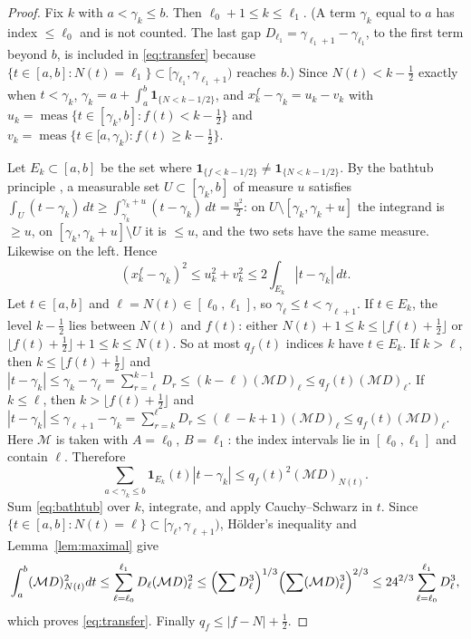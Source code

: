\documentclass[11pt,a4paper]{article}
\makeatletter
\numberwithin{equation}{section}
\DeclareRobustCommand{\CGref}[1]{\ref{#1}}
\DeclareRobustCommand{\CGeqref}[1]{\eqref{#1}}
\DeclareRobustCommand{\CGcite}[2][]{\if\relax\detokenize{#1}\relax\cite{#2}\else\cite[#1]{#2}\fi}
\let\CG@origref\ref
\let\CG@origeqref\eqref
\newcommand{\CG@gettip}[1]{\@ifundefined{CGTip@#1}{#1}{\csname CGTip@#1\endcsname}}
\newcommand{\CG@getbib}[1]{\@ifundefined{CGBib@#1}{#1}{\csname CGBib@#1\endcsname}}
\DeclareRobustCommand{\CGref}[1]{\pdftooltip{\CG@origref{#1}}{\CG@gettip{#1}}}
\DeclareRobustCommand{\CGeqref}[1]{\pdftooltip{\CG@origeqref{#1}}{\CG@gettip{#1}}}
\DeclareRobustCommand{\CGcite}[2][]{\pdftooltip{\if\relax\detokenize{#1}\relax\cite{#2}\else\cite[#1]{#2}\fi}{\CG@getbib{#2}}}
\theoremstyle{definition}
\theoremstyle{remark}
\newcommand{\M}{\mathcal M}
\newcommand{\Ind}{\mathbf 1}
\newcommand{\meas}{\operatorname{meas}}
\makeatother
\begin{document}
\begin{proof}
Fix $k$ with $a<\gamma_k\le b$. Then $\ell_0+1\le k\le\ell_1$. (A term $\gamma_k$ equal to $a$ has index $\le\ell_0$ and is not counted. The last gap $D_{\ell_1}=\gamma_{\ell_1+1}-\gamma_{\ell_1}$, to the first term beyond $b$, is included in \CGeqref{eq:transfer} because $\{t\in[a,b]:N(t)=\ell_1\}\subset[\gamma_{\ell_1},\gamma_{\ell_1+1})$ reaches $b$.) Since $N(t)<k-\frac12$ exactly when $t<\gamma_k$, $\gamma_k=a+\int_a^b\Ind_{\{N<k-1/2\}}$, and $x^f_k-\gamma_k=u_k-v_k$ with $u_k=\meas\{t\in[\gamma_k,b]:f(t)<k-\frac12\}$ and $v_k=\meas\{t\in[a,\gamma_k):f(t)\ge k-\frac12\}$.

Let $E_k\subset[a,b]$ be the set where $\Ind_{\{f<k-1/2\}}\ne\Ind_{\{N<k-1/2\}}$. By the bathtub principle \CGcite[Thm.~1.14]{LiebLoss2001}, a measurable set $U\subset[\gamma_k,b]$ of measure $u$ satisfies $\int_U(t-\gamma_k)\,dt\ge\int_{\gamma_k}^{\gamma_k+u}(t-\gamma_k)\,dt=\frac{u^2}2$: on $U\setminus[\gamma_k,\gamma_k+u]$ the integrand is $\ge u$, on $[\gamma_k,\gamma_k+u]\setminus U$ it is $\le u$, and the two sets have the same measure. Likewise on the left. Hence
\begin{equation}
(x^f_k-\gamma_k)^2\le u_k^2+v_k^2\le2\int_{E_k}|t-\gamma_k|\,dt .
\label{eq:bathtub}
\end{equation}
Let $t\in[a,b]$ and $\ell=N(t)\in[\ell_0,\ell_1]$, so $\gamma_\ell\le t<\gamma_{\ell+1}$. If $t\in E_k$, the level $k-\frac12$ lies between $N(t)$ and $f(t)$: either $N(t)+1\le k\le\lfloor f(t)+\frac12\rfloor$ or $\lfloor f(t)+\frac12\rfloor+1\le k\le N(t)$. So at most $q_f(t)$ indices $k$ have $t\in E_k$. If $k>\ell$, then $k\le\lfloor f(t)+\frac12\rfloor$ and $|t-\gamma_k|\le\gamma_k-\gamma_\ell=\sum_{r=\ell}^{k-1}D_r\le(k-\ell)(\M D)_\ell\le q_f(t)(\M D)_\ell$. If $k\le\ell$, then $k>\lfloor f(t)+\frac12\rfloor$ and $|t-\gamma_k|\le\gamma_{\ell+1}-\gamma_k=\sum_{r=k}^{\ell}D_r\le(\ell-k+1)(\M D)_\ell\le q_f(t)(\M D)_\ell$. Here $\M$ is taken with $A=\ell_0$, $B=\ell_1$: the index intervals lie in $[\ell_0,\ell_1]$ and contain $\ell$. Therefore
\begin{equation}
\sum_{a<\gamma_k\le b}\Ind_{E_k}(t)|t-\gamma_k|\le q_f(t)^2(\M D)_{N(t)} .
\label{eq:disp_22}
\end{equation}
Sum \CGeqref{eq:bathtub} over $k$, integrate, and apply Cauchy--Schwarz in $t$. Since $\{t\in[a,b]:N(t)=\ell\}\subset[\gamma_\ell,\gamma_{\ell+1})$, H\"older's inequality and Lemma~\CGref{lem:maximal} give
\begin{equation}
\int_a^b(\M D)_{N(t)}^2dt\le\sum_{\ell=\ell_0}^{\ell_1}D_\ell(\M D)_\ell^2\le\Bigl(\sum D_\ell^3\Bigr)^{1/3}\Bigl(\sum(\M D)_\ell^3\Bigr)^{2/3}\le24^{2/3}\sum_{\ell=\ell_0}^{\ell_1}D_\ell^3 ,
\label{eq:disp_23}
\end{equation}
which proves \CGeqref{eq:transfer}. Finally $q_f\le|f-N|+\frac12$.
\end{proof}
\end{document}
